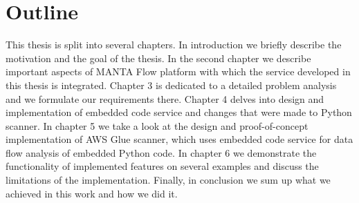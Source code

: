 \section{Outline}

This thesis is split into several chapters. In introduction we briefly describe the motivation and the goal of the thesis. In the second chapter we describe important aspects of MANTA Flow platform with which the service developed in this thesis is integrated. Chapter 3 is dedicated to a detailed problem analysis and we formulate our requirements there. Chapter 4 delves into design and implementation of embedded code service and changes that were made to Python scanner. In chapter 5 we take a look at the design and proof-of-concept implementation of AWS Glue scanner, which uses embedded code service for data flow analysis of embedded Python code. In chapter 6 we demonstrate the functionality of implemented features on several examples and discuss the limitations of the implementation. Finally, in conclusion we sum up what we achieved in this work and how we did it.